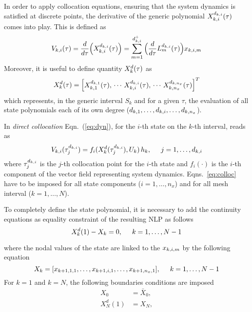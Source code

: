 In order to apply collocation equations, ensuring that the system dynamics is satisfied at discrete points, the derivative of the generic polynomial $X_{k,i}^{d_{k,i}} (\tau)$ comes into play. This is defined as
\begin{equation}
V_{k,i} (\tau) = \frac{d}{d\tau}\Big(X_{k,i}^{d_{k,i}}(\tau)\Big) = \sum_{m=1}^{d_{k,i}^{+}}\Big(\frac{d}{d\tau}L_{m}^{d_{k,i}}(\tau)\Big)x_{k,i,m}
\end{equation}
Moreover, it is useful to define quantity $X_{k}^{d} (\tau)$ as
\begin{equation}
X_{k}^{d}(\tau) =
\begin{bmatrix}
X_{k,1}^{d_{k,1}}(\tau),\, \cdots \, X_{k,i}^{d_{k,i}}(\tau), \, \cdots\,
X_{k,n_x}^{d_{k,n_x}}(\tau)
\end{bmatrix}^T
\end{equation}
which represents, in the generic interval $S_k$ and for a given $\tau$, the evaluation of all state polynomials each of its own degree ($d_{k,1}, \dots, d_{k,i}, \dots, d_{k,n_{x}}$).

In \emph{direct collocation} Eqn.~(\ref{eq:dyn}), for the $i$-th state on the $k$-th interval, reads as
\begin{equation}\label{eq:colloc}
V_{k,i}(\tau_{j}^{d_{k,i}}) = f_i(X_{k}^{d}(\tau_{j}^{d_{k,i}}),  U_k)\, h_{k}, \hspace{5mm} j = 1, \dots, d_{k,i}
\end{equation}
where $\tau_{j}^{d_{k,i}}$ is the $j$-th collocation point for the $i$-th state and $f_i(\cdot)$ is the $i$-th component of the vector field representing system dynamics. Eqns.~\eqref{eq:colloc} have to be imposed for all state components ($i = 1, \dots, n_x$) and for all mesh interval ($k = 1, \dots, N$).

To completely define the state polynomial, it is necessary to add the continuity equations  as equality constraint of the resulting NLP as follows
\begin{equation}\label{eq:continuity}
X_{k}^{d}(1) - X_k = 0, \hspace{5mm} k = 1, \dots, N-1
\end{equation}

where the nodal values of the state are linked to the $x_{k,i,m}$ by the following equation
\begin{equation}
X_k = [x_{k+1,1,1}, \dots, x_{k+1,i,1}, \dots, x_{k+1,n_{x},1}], \hspace{5mm} k = 1, \dots, N-1
\end{equation}
For $k = 1$ and $k = N$, the following boundaries conditions are imposed
\begin{align}
	X_{0}         &= \bar{X}_{0} \label{eq:intial},\\
	X_{N}^{d}(1)  &= X_N \label{eq:final},
\end{align}

